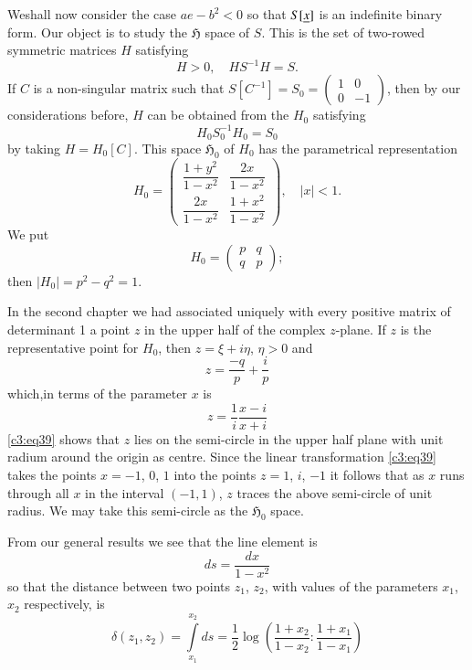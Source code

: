 We\pageoriginale shall now consider the case $ae-b^{2}<0$ so that
$S[\underline{x}]$ is an indefinite binary form. Our object is to study the
$\mathfrak{H}$ space of $S$. This is the set of two-rowed symmetric
matrices $H$ satisfying
$$
H>0,\quad HS^{-1}H=S.
$$
If $C$ is a non-singular matrix such that
$S[C^{-1}]=S_{0}=\left(\begin{smallmatrix}1 & 0\\ 0 & -1
\end{smallmatrix}\right)$, then by our considerations before, $H$ can
be obtained from the $H_{0}$ satisfying
$$
H_{0}S^{-1}_{0}H_{0}=S_{0}
$$
by taking $H=H_{0}[C]$. This space $\mathfrak{H}_{0}$ of $H_{0}$ has
the parametrical representation
$$
H_{0}=
\begin{pmatrix}
\dfrac{1+y^{2}}{1-x^{2}} & \dfrac{2x}{1-x^{2}}\\[10pt]
\dfrac{2x}{1-x^{2}} & \dfrac{1+x^{2}}{1-x^{2}}
\end{pmatrix},\quad |x|<1.
$$
We put
$$
H_{0}=
\begin{pmatrix}
p & q\\
q & p
\end{pmatrix};
$$
then $|H_{0}|=p^{2}-q^{2}=1$.

In the second chapter we had associated uniquely with every positive
matrix of determinant 1 a point $z$ in the upper half of the complex
$z$-plane. If $z$ is the representative point for $H_{0}$, then
$z=\xi+i\eta$, $\eta>0$ and 
$$
z=\dfrac{-q}{p}+\dfrac{i}{p}
$$
which,\pageoriginale in terms of the parameter $x$ is
\begin{equation*}
z=\dfrac{1}{i}\dfrac{x-i}{x+i}\tag{39}\label{c3:eq39}
\end{equation*}
\eqref{c3:eq39} shows that $z$ lies on the semi-circle in the upper half
plane with unit radium around the origin as centre. Since the linear
transformation \eqref{c3:eq39} takes the points $x=-1$, $0$, $1$ into the
points $z=1$, $i$, $-1$ it follows that as $x$ runs through all $x$ in
the interval $(-1,1)$, $z$ traces the above semi-circle of unit
radius. We may take this semi-circle as the $\mathfrak{H}_{0}$ space.

From our general results we see that the line element is
\begin{equation*}
ds=\dfrac{dx}{1-x^{2}}\tag{40}\label{c3:eq40}
\end{equation*}
so that the distance between two points $z_{1}$, $z_{2}$, with values
of the parameters $x_{1}$, $x_{2}$ respectively, is
\begin{equation*}
\delta(z_{1},z_{2})=\int\limits^{x_{2}}_{x_{1}}d s =\frac{1}{2}\log
\left(\frac{1+x_{2}}{1-x_{2}}:\frac{1+x_{1}}{1-x_{1}}\right)\tag{41}\label{c3:eq41}
\end{equation*}

